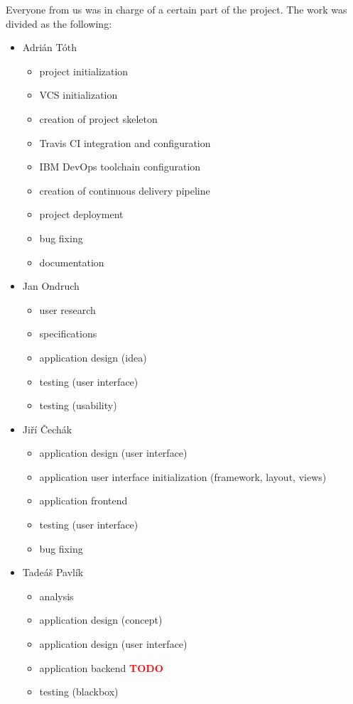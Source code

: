 \documentclass[11pt,a4paper]{article}
\newcommand{\TODO}{\textbf{\textcolor{red}{TODO}}} %
\begin{document}
Everyone from us was in charge of a certain part of the project. The work was divided as the following:
\begin{itemize}
    \item Adrián Tóth
    \begin{itemize}
        \item project initialization
        \item VCS initialization
        \item creation of project skeleton
        \item Travis CI integration and configuration
        \item IBM DevOps toolchain configuration
        \item creation of continuous delivery pipeline
        \item project deployment
        \item bug fixing
        \item documentation
    \end{itemize}

    \item Jan Ondruch
    \begin{itemize}
        \item user research
        \item specifications
        \item application design (idea)
        \item testing (user interface)
        \item testing (usability)
    \end{itemize}

    \item Jiří Čechák
    \begin{itemize}
        \item application design (user interface)
        \item application user interface initialization (framework, layout, views)
        \item application frontend
        \item testing (user interface)
        \item bug fixing
    \end{itemize}

    \item Tadeáš Pavlík
    \begin{itemize}
        \item analysis
        \item application design (concept)
        \item application design (user interface)
        \item application backend \TODO
        \item testing (blackbox)
    \end{itemize}


\end{itemize}
\end{document}
